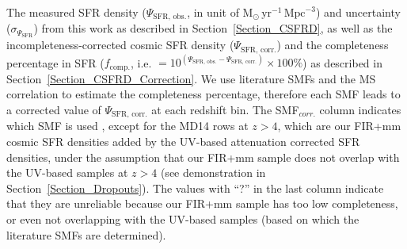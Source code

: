 \begin{table}
\begin{center}
\begin{tabular}{ c c c c c c c }
\end{tabular}

\begin{minipage}{0.42\textwidth}

    The measured SFR density ($\Psi_{\mathrm{SFR,\,obs.}}$, in unit of $\mathrm{M}_{\odot}\,\mathrm{yr}^{-1}\,\mathrm{Mpc}^{-3}$) and uncertainty (${\sigma}_{\Psi_{\mathrm{SFR}}}$) from this work as described in Section~\ref{Section_CSFRD}, as well as the incompleteness-corrected cosmic SFR density ($\Psi_{\mathrm{SFR,\,corr.}}$) and the completeness percentage in SFR ($f_{\mathrm{comp.}}$, i.e. $=10^{(\Psi_{\mathrm{SFR,\,obs.}}-\Psi_{\mathrm{SFR,\,corr.}})} \times 100\%$) as described in Section~\ref{Section_CSFRD_Correction}. 
    We use literature SMFs and the \citet{Sargent2014} MS correlation to estimate the completeness percentage, therefore each SMF leads to a corrected value of $\Psi_{\mathrm{SFR,\,corr.}}$ at each redshift bin. The SMF$_{corr.}$ column indicates which SMF is used \citep{Muzzin2013,Ilbert2013,Davidzon2017,Grazian2015,Song2016}, except for the MD14 \citep{Madau2014a} rows at $z>4$, which are our FIR+mm cosmic SFR densities added by the \citep{Madau2014a} UV-based attenuation corrected SFR densities, under the assumption that our FIR+mm sample does not overlap with the UV-based samples at $z>4$ (see demonstration in Section~\ref{Section_Dropouts}).
    The values with ``?'' in the last column indicate that they are unreliable because our FIR+mm sample has too low completeness, or even not overlapping with the UV-based samples (based on which the literature SMFs are determined). 

\end{minipage}

\end{center}

\end{table}



